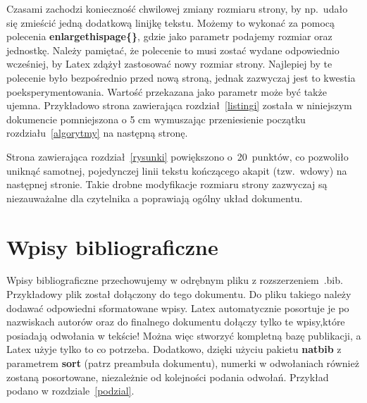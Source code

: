 \documentclass[twoside,a4paper]{book}
\begin{document}
Czasami zachodzi konieczność chwilowej zmiany rozmiaru strony, by np.\ udało się zmieścić jedną dodatkową linijkę tekstu. Możemy to wykonać za pomocą polecenia \textbf{enlargethispage\{\}}, gdzie jako parametr podajemy rozmiar oraz jednostkę. Należy pamiętać, że polecenie to musi zostać wydane odpowiednio wcześniej, by Latex zdążył zastosować nowy rozmiar strony. Najlepiej by te polecenie było bezpośrednio przed nową stroną, jednak zazwyczaj jest to kwestia poeksperymentowania. Wartość przekazana jako parametr może być także ujemna. Przykładowo strona zawierająca rozdział~\ref{listingi} została w niniejszym dokumencie pomniejszona o 5 cm wymuszając przeniesienie początku rozdziału~\ref{algorytmy} na następną stronę.

Strona zawierająca rozdział~\ref{rysunki} powiększono o~20~punktów, co pozwoliło uniknąć samotnej, pojedynczej linii tekstu kończącego akapit (tzw.\ wdowy) na następnej stronie. Takie drobne modyfikacje rozmiaru strony zazwyczaj są niezauważalne dla czytelnika a poprawiają ogólny układ dokumentu.

\section{Wpisy bibliograficzne}

Wpisy bibliograficzne przechowujemy w odrębnym pliku z rozszerzeniem\ .bib. Przykładowy plik został dołączony do tego dokumentu. Do pliku takiego należy dodawać odpowiedni sformatowane wpisy. Latex automatycznie posortuje je po nazwiskach autorów oraz do finalnego dokumentu dołączy tylko te wpisy,które posiadają odwołania w tekście! Można więc stworzyć kompletną bazę publikacji, a Latex użyje tylko to co potrzeba. Dodatkowo, dzięki użyciu pakietu \textbf{natbib} z parametrem \textbf{sort} (patrz preambuła dokumentu), numerki w odwołaniach również zostaną posortowane, niezależnie od kolejności podania odwołań. Przykład podano w rozdziale~\ref{podzial}.


\backmatter

\listoffigures
\listoftables
\listofalgorithms



\end{document}
